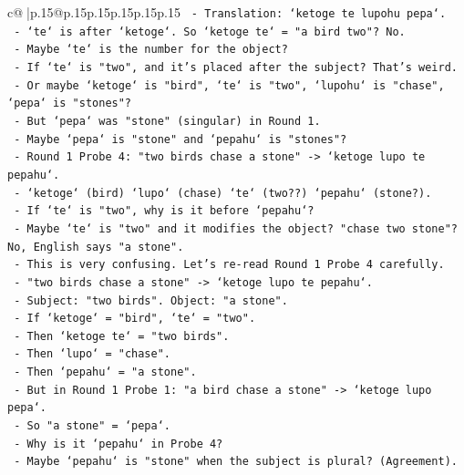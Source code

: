 \documentclass{article}
\begin{document}
{\begin{supertabular}{c@{$\;$}|p{.15\linewidth}@{}p{.15\linewidth}p{.15\linewidth}p{.15\linewidth}p{.15\linewidth}p{.15\linewidth}}
{{{\texttt{          {-} Translation: `ketoge te lupohu pepa`.} \\
\texttt{          {-} `te` is after `ketoge`. So `ketoge te` = "a bird two"? No.} \\
\texttt{          {-} Maybe `te` is the number for the object?} \\
\texttt{          {-} If `te` is "two", and it's placed after the subject? That's weird.} \\
\texttt{          {-} Or maybe `ketoge` is "bird", `te` is "two", `lupohu` is "chase", `pepa` is "stones"?} \\
\texttt{          {-} But `pepa` was "stone" (singular) in Round 1.} \\
\texttt{          {-} Maybe `pepa` is "stone" and `pepahu` is "stones"?} \\
\texttt{          {-} Round 1 Probe 4: "two birds chase a stone" {-}> `ketoge lupo te pepahu`.} \\
\texttt{            {-} `ketoge` (bird) `lupo` (chase) `te` (two??) `pepahu` (stone?).} \\
\texttt{            {-} If `te` is "two", why is it before `pepahu`?} \\
\texttt{            {-} Maybe `te` is "two" and it modifies the object? "chase two stone"? No, English says "a stone".} \\
\texttt{            {-} This is very confusing. Let's re{-}read Round 1 Probe 4 carefully.} \\
\texttt{            {-} "two birds chase a stone" {-}> `ketoge lupo te pepahu`.} \\
\texttt{            {-} Subject: "two birds". Object: "a stone".} \\
\texttt{            {-} If `ketoge` = "bird", `te` = "two".} \\
\texttt{            {-} Then `ketoge te` = "two birds".} \\
\texttt{            {-} Then `lupo` = "chase".} \\
\texttt{            {-} Then `pepahu` = "a stone".} \\
\texttt{            {-} But in Round 1 Probe 1: "a bird chase a stone" {-}> `ketoge lupo pepa`.} \\
\texttt{            {-} So "a stone" = `pepa`.} \\
\texttt{            {-} Why is it `pepahu` in Probe 4?} \\
\texttt{            {-} Maybe `pepahu` is "stone" when the subject is plural? (Agreement).} \\
}}}
\end{supertabular}}
\end{document}

